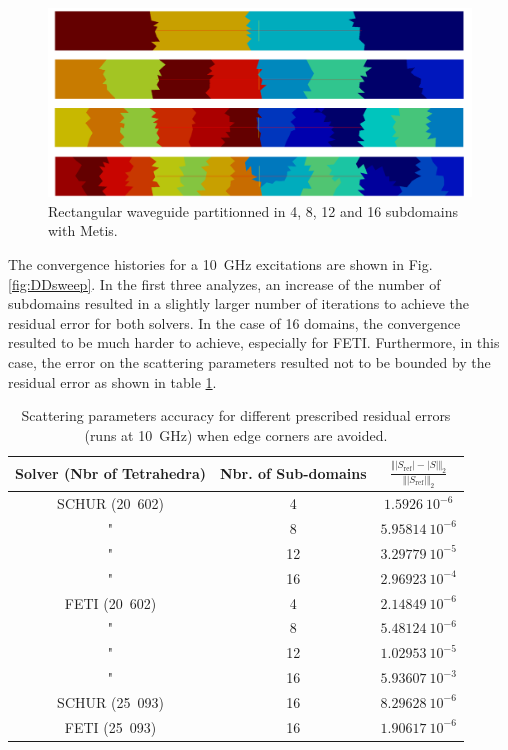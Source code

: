 \begin{figure}[h!]
\centering
\includegraphics[width=13.4cm]{Partitions}
\caption{Rectangular waveguide partitionned in 4, 8, 12 and 16 subdomains with Metis.}
\label{fig:Partitions}
\end{figure}

The convergence histories for a 10~GHz excitations are shown in Fig. \ref{fig:DDsweep}. In the first three analyzes, an increase of the number of subdomains resulted in a slightly larger number of iterations to achieve the residual error for both solvers. In the case of 16 domains, the convergence resulted to be much harder to achieve, especially for FETI. Furthermore, in this case, the error on the scattering parameters resulted not to be bounded by the residual error as shown in table \ref{tab:SaccDDSweep}.

\begin{table}[h]
\begin{center}
\begin{tabular}{|c|c|c|}
\hline 
Solver (Nbr of Tetrahedra) & Nbr. of Sub-domains & $\frac{\Vert |S_\mathrm{ref}| - |S| \Vert_{2}}{\Vert|S_\mathrm{ref}|\Vert_2}$\\ 
\hline \hline 
\setlength{\arrayrulewidth}{0.5pt}
SCHUR (20~602) & 4 & $1.5926~10^{-6}$\\ \hline 
"& 8 & $5.95814~10^{-6}$\\ \hline 
"& 12 &  $3.29779~10^{-5}$\\ \hline 
"& 16 & $2.96923~10^{-4}$\\ \hline
FETI (20~602) & 4 & $2.14849~10^{-6}$\\ \hline 
"& 8  & $5.48124~10^{-6}$\\ \hline 
"& 12 & $1.02953~10^{-5}$\\ \hline 
"& 16 & $5.93607~10^{-3}$\\ \hline
SCHUR (25~093) & 16 & $8.29628~10^{-6}$\\ \hline 
FETI (25~093) & 16 & $1.90617~10^{-6}$\\ \hline 
\end{tabular}
\end{center}
\caption{Scattering parameters accuracy for different prescribed residual errors (runs at 10~GHz) when edge corners are avoided.}
\label{tab:SaccDDSweep}
\end{table}

